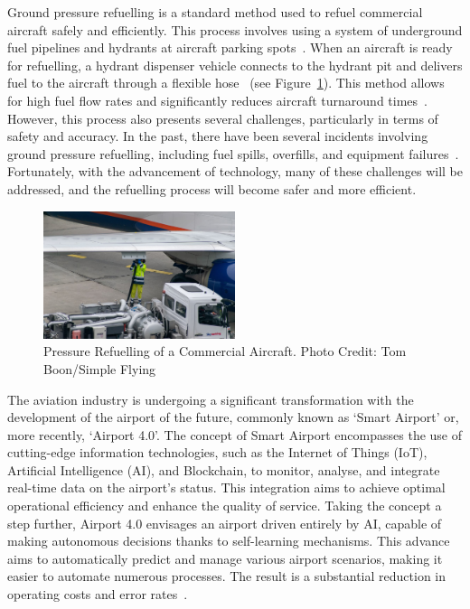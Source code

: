 \documentclass[12pt,oneside]{book} %
\begin{document}
Ground pressure refuelling is a standard method used to refuel commercial
aircraft safely and efficiently. This process involves using a system of
underground fuel pipelines and hydrants at aircraft parking
spots~\cite{blakey2011aviation}. When an aircraft is ready for refuelling, a
hydrant dispenser vehicle connects to the hydrant pit and delivers fuel to the
aircraft through a flexible hose~\cite{sati2019aircraft} (see
Figure~\ref{fig:pressure-refuelling}). This method allows for high fuel flow
rates and significantly reduces aircraft turnaround
times~\cite{blakey2011aviation}. However, this process also presents several
challenges, particularly in terms of safety and accuracy. In the past, there
have been several incidents involving ground pressure refuelling, including
fuel spills, overfills, and equipment
failures~\cite{doi:10.1080/13669877.2013.879493, CostsOfUnsafetyAviation}.
Fortunately, with the advancement of technology, many of these challenges will
be addressed, and the refuelling process will become safer and more efficient. 

\begin{figure}[H]
    \centering
    \includegraphics[width=0.5\textwidth]{figures/pressure-refuelling.jpeg}
    \caption{Pressure Refuelling of a Commercial Aircraft. Photo Credit: Tom Boon/Simple Flying~\cite{ImageRefueling}}\label{fig:pressure-refuelling}
\end{figure}

The aviation industry is undergoing a significant transformation with the
development of the airport of the future, commonly known as `Smart Airport’ or,
more recently, `Airport 4.0’. The concept of Smart Airport encompasses the use
of cutting-edge information technologies, such as the Internet of Things (IoT),
Artificial Intelligence (AI), and Blockchain, to monitor, analyse, and
integrate real-time data on the airport's status. This integration aims to
achieve optimal operational efficiency and enhance the quality of service.
Taking the concept a step further, Airport 4.0 envisages an airport driven
entirely by AI, capable of making autonomous decisions thanks to self-learning
mechanisms. This advance aims to automatically predict and manage various
airport scenarios, making it easier to automate numerous processes. The result
is a substantial reduction in operating costs and error
rates~\cite{10.1007/978-981-16-5943-0_26}.
\end{document}

